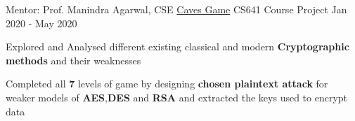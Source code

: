 
\begin{cventries}

%        
  
   \cventry
    {Mentor: Prof. Manindra Agarwal, CSE}
    {\href{https://github.com/RohitRanjangit/CavesGame}{Caves Game}}
    {CS641 Course Project}
    {Jan 2020 - May 2020}
    {
      \begin{cvitems}
        \item {Explored and Analysed different existing classical and modern \textbf{Cryptographic methods} and their weaknesses}
        \item {Completed all \textbf{7} levels of game by designing \textbf{chosen plaintext attack} for weaker models of \textbf{AES},\textbf{DES} and \textbf{RSA} and extracted the keys used to encrypt data}
      \end{cvitems}
    }


\end{cventries}
